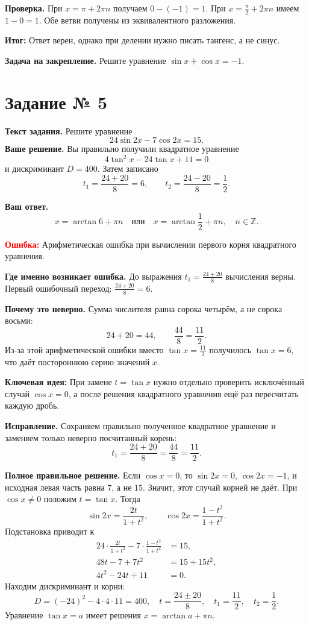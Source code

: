 \documentclass[12pt,a4paper]{article}
\newcommand{\err}{\textcolor{red}{Ошибка:}}
\newcommand{\idea}{\textcolor{blue!60!black}{Ключевая идея:}}
\newcommand{\result}{\textcolor{teal!60!black}{Итог:}}
\begin{document}
\textbf{Проверка.} При $x=\pi+2\pi n$ получаем $0-(-1)=1$. При $x=\frac\pi2+2\pi n$ имеем $1-0=1$. Обе ветви получены из эквивалентного разложения.

\textbf{\result} Ответ верен, однако при делении нужно писать тангенс, а не синус.

\textbf{Задача на закрепление.} Решите уравнение $\sin x+\cos x=-1$.

\newpage
{}\label{task:5}
\section*{Задание № 5}
\textbf{Текст задания.} Решите уравнение
\[24\sin2x-7\cos2x=15.\]
\textbf{Ваше решение.} Вы правильно получили квадратное уравнение
\[4\tan^2x-24\tan x+11=0\]
и дискриминант $D=400$. Затем записано
\[t_1=\frac{24+20}{8}=6,\qquad t_2=\frac{24-20}{8}=\frac12.\]

\textbf{Ваш ответ.}
\[x=\arctan6+\pi n\quad\text{или}\quad x=\arctan\frac12+\pi n,\quad n\in\mathbb Z.\]

\textbf{\err} Арифметическая ошибка при вычислении первого корня квадратного уравнения.

\textbf{Где именно возникает ошибка.} До выражения $t_1=\frac{24+20}{8}$ вычисления верны. Первый ошибочный переход: $\frac{24+20}{8}=6$.

\textbf{Почему это неверно.} Сумма числителя равна сорока четырём, а не сорока восьми:
\[24+20=44,\qquad \frac{44}{8}=\frac{11}{2}.\]
Из-за этой арифметической ошибки вместо $\tan x=\frac{11}{2}$ получилось $\tan x=6$, что даёт постороннюю серию значений $x$.

\textbf{\idea} При замене $t=\tan x$ нужно отдельно проверить исключённый случай $\cos x=0$, а после решения квадратного уравнения ещё раз пересчитать каждую дробь.

\textbf{Исправление.} Сохраняем правильно полученное квадратное уравнение и заменяем только неверно посчитанный корень:
\[t_1=\frac{24+20}{8}=\frac{44}{8}=\frac{11}{2}.\]

\textbf{Полное правильное решение.} Если $\cos x=0$, то $\sin2x=0$, $\cos2x=-1$, и исходная левая часть равна $7$, а не $15$. Значит, этот случай корней не даёт.
При $\cos x\ne0$ положим $t=\tan x$. Тогда
\[\sin2x=\frac{2t}{1+t^2},\qquad \cos2x=\frac{1-t^2}{1+t^2}.\]
Подстановка приводит к
\begin{align*}
24\cdot\frac{2t}{1+t^2}-7\cdot\frac{1-t^2}{1+t^2}&=15,\\
48t-7+7t^2&=15+15t^2,\\
4t^2-24t+11&=0.
\end{align*}
Находим дискриминант и корни:
\[D=(-24)^2-4\cdot4\cdot11=400,\quad
 t=\frac{24\pm20}{8},\quad
 t_1=\frac{11}{2},\quad t_2=\frac12.\]
Уравнение $\tan x=a$ имеет решения $x=\arctan a+\pi n$.
\end{document}
